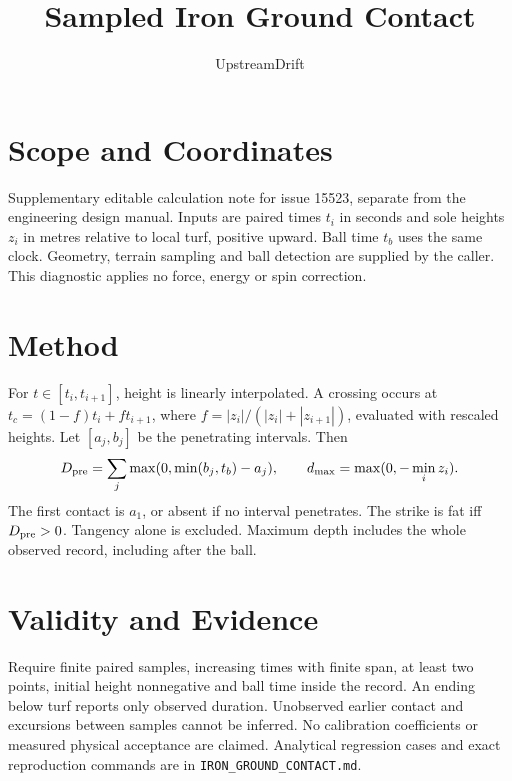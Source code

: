 \documentclass{article}
\title{Sampled Iron Ground Contact}
\author{UpstreamDrift}
\date{}
\begin{document}
\maketitle
\section{Scope and Coordinates}
Supplementary editable calculation note for issue 15523, separate from the
engineering design manual. Inputs are paired times $t_i$ in seconds and sole
heights $z_i$ in metres relative to local turf, positive upward. Ball time $t_b$
uses the same clock. Geometry, terrain sampling and ball detection are supplied
by the caller. This diagnostic applies no force, energy or spin correction.
\section{Method}
For $t\in[t_i,t_{i+1}]$, height is linearly interpolated. A crossing occurs at
$t_c=(1-f)t_i+ft_{i+1}$, where
$f=|z_i|/(|z_i|+|z_{i+1}|)$, evaluated with rescaled heights.
Let $[a_j,b_j]$ be the penetrating intervals. Then
\[
 D_{\rm pre}=\sum_j\max(0,\min(b_j,t_b)-a_j),\qquad
 d_{\max}=\max(0,-\min_i z_i).
\]
The first contact is $a_1$, or absent if no interval penetrates. The strike is
fat iff $D_{\rm pre}>0$. Tangency alone is excluded. Maximum depth includes the
whole observed record, including after the ball.
\section{Validity and Evidence}
Require finite paired samples, increasing times with finite span, at least two
points, initial height nonnegative and ball time inside the record. An ending
below turf reports only observed duration. Unobserved earlier contact and
excursions between samples cannot be inferred. No calibration coefficients or
measured physical acceptance are claimed. Analytical regression cases and exact
reproduction commands are in \texttt{IRON\_GROUND\_CONTACT.md}.
\end{document}

